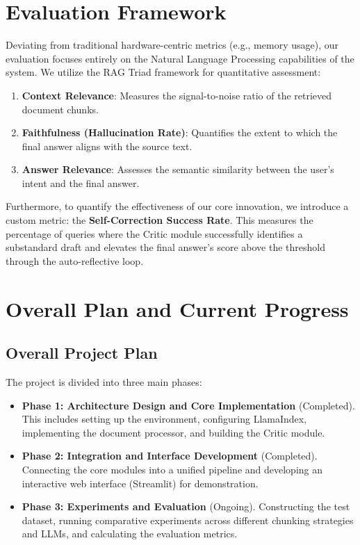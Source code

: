 \documentclass[11pt,a4paper]{article}
\begin{document}
\section{Evaluation Framework}
Deviating from traditional hardware-centric metrics (e.g., memory usage), our evaluation focuses entirely on the Natural Language Processing capabilities of the system. We utilize the RAG Triad framework for quantitative assessment:

\begin{enumerate}
    \item \textbf{Context Relevance}: Measures the signal-to-noise ratio of the retrieved document chunks.
    \item \textbf{Faithfulness (Hallucination Rate)}: Quantifies the extent to which the final answer aligns with the source text.
    \item \textbf{Answer Relevance}: Assesses the semantic similarity between the user's intent and the final answer.
\end{enumerate}

Furthermore, to quantify the effectiveness of our core innovation, we introduce a custom metric: the \textbf{Self-Correction Success Rate}. This measures the percentage of queries where the Critic module successfully identifies a substandard draft and elevates the final answer's score above the threshold through the auto-reflective loop.

\section{Overall Plan and Current Progress}

\subsection{Overall Project Plan}
The project is divided into three main phases:
\begin{itemize}
    \item \textbf{Phase 1: Architecture Design and Core Implementation} (Completed). This includes setting up the environment, configuring LlamaIndex, implementing the document processor, and building the Critic module.
    \item \textbf{Phase 2: Integration and Interface Development} (Completed). Connecting the core modules into a unified pipeline and developing an interactive web interface (Streamlit) for demonstration.
    \item \textbf{Phase 3: Experiments and Evaluation} (Ongoing). Constructing the test dataset, running comparative experiments across different chunking strategies and LLMs, and calculating the evaluation metrics.
\end{itemize}
\end{document}
